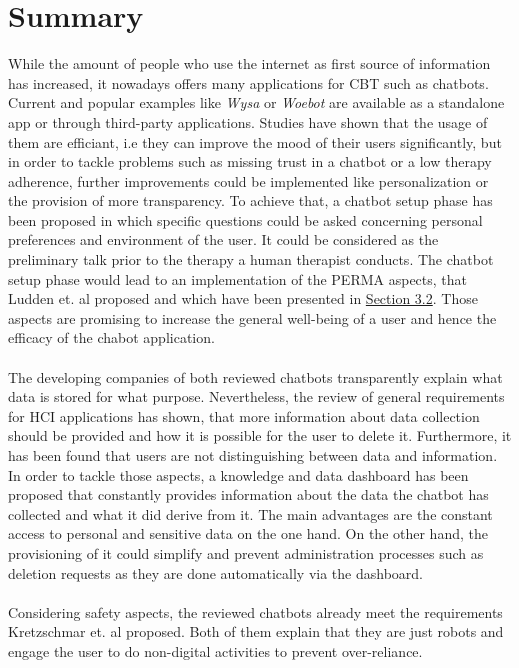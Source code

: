 \documentclass[sigconf, nonacm]{acmart}
\begin{document}
\section{Summary}
\label{sec:five}
While the amount of people who use the internet as first source of information has increased\cite{Wyatt2015}, it nowadays offers many applications for CBT such as chatbots. 
\\
Current and popular examples like \emph{Wysa} or \emph{Woebot} are available as a standalone app or through third-party applications. Studies have shown that the usage of them are efficiant, i.e they can improve the mood of their users significantly\cite{Fitzpatrick2017,Inkster}, but in order to tackle problems such as missing trust in a chatbot or a low therapy adherence, further improvements could be implemented like personalization 
or the provision of more transparency. To achieve that, a chatbot setup phase has been proposed in which specific questions could be asked concerning personal preferences and environment of the user. It could be considered as the preliminary talk prior to the therapy a human therapist conducts.
The chatbot setup phase would lead to an implementation of the PERMA aspects, that Ludden et. al \cite{Ludden2015} proposed and which have been presented in \hyperref[sec:three_two]{Section 3.2}. Those aspects are promising to increase the general well-being of a user and hence the efficacy of the chabot application.
\\\\
The developing companies of both reviewed chatbots transparently explain what data is stored for what purpose.
Nevertheless, the review of general requirements for HCI applications has shown, that more information about data collection should be provided and how it is possible for the user to delete it\cite{Saglam2021}.
Furthermore, it has been found that users are not distinguishing between data and information\cite{Lee2011}.
In order to tackle those aspects, a knowledge and data dashboard has been proposed that constantly provides information about the data the chatbot has collected and what it did derive from it.
The main advantages are the constant access to personal and sensitive data on the one hand. On the other hand, the provisioning of it could simplify and prevent administration processes such as deletion requests as they are done automatically via the dashboard.
\\\\
Considering safety aspects, the reviewed chatbots already meet the requirements Kretzschmar et. al \cite{Kretzschmar2019} proposed. Both of them explain that they are just robots and engage the user to do non-digital activities to prevent over-reliance.
\end{document}
